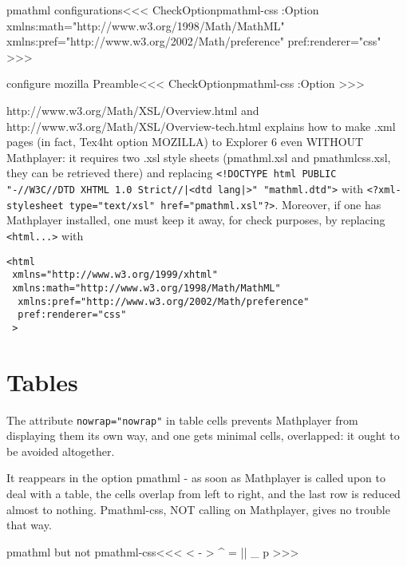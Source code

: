 \<pmathml configurations\><<<
\:CheckOption{pmathml-css} \if:Option
     {xmlns:math="http://www.w3.org/1998/Math/MathML"\Hnewline
      xmlns:pref="http://www.w3.org/2002/Math/preference"\Hnewline
      pref:renderer="css"
     }
\fi
>>>


\<configure mozilla Preamble\><<<    
\:CheckOption{pmathml-css} \if:Option
   \edef\Preamble{\Preamble,pmathml}
\fi
>>>


%
http://www.w3.org/Math/XSL/Overview.html\EndLink{} and
%
http://www.w3.org/Math/XSL/Overview-tech.html\EndLink{} explains how
to make .xml pages (in fact, Tex4ht option MOZILLA) to Explorer 6 even
WITHOUT Mathplayer: it requires two .xsl style sheets (pmathml.xsl and
pmathmlcss.xsl, they can be retrieved there) and replacing
\verb+<!DOCTYPE html PUBLIC "-//W3C//DTD XHTML 1.0 Strict//|<dtd lang|>" "mathml.dtd">+ 
with 
\verb+<?xml-stylesheet type="text/xsl" href="pmathml.xsl"?>+.  
Moreover, if one has Mathplayer installed, one must keep it away, for
check purposes, by replacing    \verb+<html...>+ with

\begin{verbatim}
<html
 xmlns="http://www.w3.org/1999/xhtml"
 xmlns:math="http://www.w3.org/1998/Math/MathML"
  xmlns:pref="http://www.w3.org/2002/Math/preference"
  pref:renderer="css"
 >
\end{verbatim}


\section{Tables}


The attribute \verb+nowrap="nowrap"+ in table cells prevents
Mathplayer from displaying them its own way, and one gets minimal
cells, overlapped: it ought to be avoided altogether.

It reappears in the option pmathml - as soon as Mathplayer is called
upon to deal with a table, the cells overlap from left to right, and
the last row is reduced almost to nothing. Pmathml-css, NOT calling on
Mathplayer, gives no trouble that way.

\<pmathml but not pmathml-css\><<<
 {}{}
   {<}{\ifmathml {}\else
        \fi}
   {-}{\ifmathml {}\else
        \fi}
   {>}{\ifmathml {}\else
        \fi}
   {^}{\ifmathml {}\else
        \fi}
   {=}{\ifmathml {}\else
        \fi}
   {||}{\ifmathml {}\else
        \fi}
   {_}{\ifmathml {}\else
        \fi}
   {p}{\ifmathml {}\else
        \fi}
   {}
>>>






\endinput
